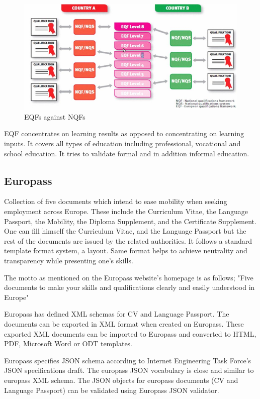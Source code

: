 \documentclass[12pt,a4paper,oneside]{book}
\begin{document}
\begin{figure}[!hbp]
  \centering
  \includegraphics[width=14cm]{eqf.png}
  \caption{EQFs against NQFs \cite{MAPQFTOOL}}
  \label{fig:EQF}
\end{figure}

    EQF concentrates on learning results as opposed to concentrating on learning inputs. It covers all types of education including professional, vocational and school education. It tries to validate formal and in addition informal education.

    \subsection{Europass}
    Collection of five documents which intend to ease mobility when seeking employment across Europe. These include the Curriculum Vitae, the Language Passport, the Mobility, the Diploma Supplement, and the Certificate Supplement. One can fill himself the Curriculum Vitae, and the Language Passport but the rest of the documents are issued by the related authorities. It follows a standard template format system, a layout. Same format helps to achieve neutrality and transparency while presenting one's skills.

    The motto as mentioned on the Europass website's homepage is as follows;
    "Five documents to make your skills and qualifications clearly and easily understood in Europe"

    Europass has defined XML schemas for CV and Language Passport. The documents can be exported in XML format when created on Europass. These exported XML documents can be imported to Europass and converted to HTML, PDF, Microsoft Word or ODT templates.

    Europass specifies JSON schema according to Internet Engineering Task Force's JSON specifications draft. The europass JSON vocabulary is close and similar to europass XML schema. The JSON objects for europass documents (CV and Language Passport) can be validated using Europass JSON validator.
\end{document}
